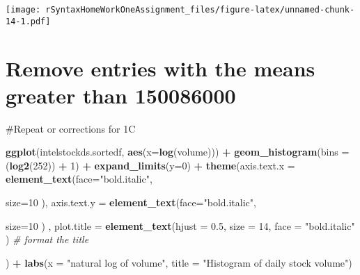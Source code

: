 \documentclass[
]{article}
\newenvironment{Shaded}{\begin{snugshade}}{\end{snugshade}}
\newcommand{\CommentTok}[1]{\textcolor[rgb]{0.56,0.35,0.01}{\textit{#1}}}
\newcommand{\DataTypeTok}[1]{\textcolor[rgb]{0.13,0.29,0.53}{#1}}
\newcommand{\DecValTok}[1]{\textcolor[rgb]{0.00,0.00,0.81}{#1}}
\newcommand{\FloatTok}[1]{\textcolor[rgb]{0.00,0.00,0.81}{#1}}
\newcommand{\KeywordTok}[1]{\textcolor[rgb]{0.13,0.29,0.53}{\textbf{#1}}}
\newcommand{\NormalTok}[1]{#1}
\newcommand{\OperatorTok}[1]{\textcolor[rgb]{0.81,0.36,0.00}{\textbf{#1}}}
\newcommand{\StringTok}[1]{\textcolor[rgb]{0.31,0.60,0.02}{#1}}
\begin{document}
\texttt{[image: rSyntaxHomeWorkOneAssignment\_files/figure-latex/unnamed-chunk-14-1.pdf]}

\hypertarget{remove-entries-with-the-means-greater-than-150086000}{%
\section{Remove entries with the means greater than
150086000}\label{remove-entries-with-the-means-greater-than-150086000}}

\begin{Shaded}
\end{Shaded}

\#Repeat or corrections for 1C

\begin{Shaded}
\begin{Highlighting}[]
\KeywordTok{ggplot}\NormalTok{(intelstockds.sortedf, }\KeywordTok{aes}\NormalTok{(}\DataTypeTok{x=}\KeywordTok{log}\NormalTok{(volume))) }\OperatorTok{+}\StringTok{ }
\StringTok{  }\KeywordTok{geom_histogram}\NormalTok{(}\DataTypeTok{bins =}\NormalTok{ (}\KeywordTok{log2}\NormalTok{(}\DecValTok{252}\NormalTok{)) }\OperatorTok{+}\StringTok{ }\DecValTok{1}\NormalTok{) }\OperatorTok{+}\StringTok{ }
\StringTok{  }\KeywordTok{expand_limits}\NormalTok{(}\DataTypeTok{y=}\DecValTok{0}\NormalTok{) }\OperatorTok{+}\StringTok{ }
\StringTok{  }\KeywordTok{theme}\NormalTok{(}\DataTypeTok{axis.text.x =} \KeywordTok{element_text}\NormalTok{(}\DataTypeTok{face=}\StringTok{"bold.italic"}\NormalTok{, }
                                   
                                   \DataTypeTok{size=}\DecValTok{10}
\NormalTok{                                   ), }
        \DataTypeTok{axis.text.y =} \KeywordTok{element_text}\NormalTok{(}\DataTypeTok{face=}\StringTok{"bold.italic"}\NormalTok{, }
                                   
                                   \DataTypeTok{size=}\DecValTok{10}
\NormalTok{                                    )}
\NormalTok{        ,}
        \DataTypeTok{plot.title =} \KeywordTok{element_text}\NormalTok{(}\DataTypeTok{hjust =} \FloatTok{0.5}\NormalTok{, }
                                  \DataTypeTok{size =} \DecValTok{14}\NormalTok{, }
                                  \DataTypeTok{face =} \StringTok{"bold.italic"}
\NormalTok{                                  ) }\CommentTok{# format the title}
         
\NormalTok{        )  }\OperatorTok{+}\StringTok{ }\KeywordTok{labs}\NormalTok{(}\DataTypeTok{x =} \StringTok{"natural log of volume"}\NormalTok{, }\DataTypeTok{title =} \StringTok{"Histogram of daily stock volume"}\NormalTok{)}
\end{Highlighting}
\end{Shaded}
\end{document}
